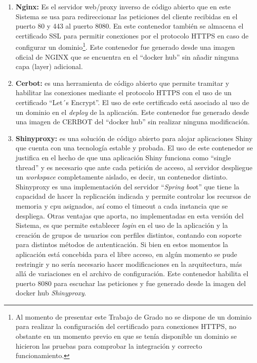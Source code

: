 \documentclass[
  12pt,
  openany]{book}
\begin{document}
\begin{enumerate}
\def\labelenumi{\arabic{enumi}.}
\item
  \textbf{Nginx:} Es el servidor web/proxy inverso de código abierto que en este Sistema se usa para redireccionar las peticiones del cliente recibidas en el puerto 80 y 443 al puerto 8080. En este contenedor también se almacena el certificado SSL para permitir conexiones por el protocolo HTTPS en caso de configurar un dominio\footnote{Al momento de presentar este Trabajo de Grado no se dispone de un dominio para realizar la configuración del certificado para conexiones HTTPS, no obstante en un momento previo en que se tenía disponible un dominio se hicieron las pruebas para comprobar la integración y correcto funcionamiento.}. Este contenedor fue generado desde una imagen oficial de NGINX que se encuentra en el ``docker hub'' sin añadir ninguna capa (layer) adicional.
\item
  \textbf{Cerbot:} es una herramienta de código abierto que permite tramitar y habilitar las conexiones mediante el protocolo HTTPS con el uso de un certificado ``Let´s Encrypt''. El uso de este certificado está asociado al uso de un dominio en el \emph{deploy} de la aplicación. Este contenedor fue generado desde una imagen de CERBOT del ``docker hub'' sin realizar ninguna modificación.
\item
  \textbf{Shinyproxy:} es una solución de código abierto para alojar aplicaciones Shiny \citep{shinyproxy2023} que cuenta con una tecnología estable y probada. El uso de este contenedor se justifica en el hecho de que una aplicación Shiny funciona como ``single thread'' y es necesario que ante cada petición de acceso, al servidor despliegue un \emph{workspace} completamente aislado, es decir, un contenedor distinto. Shinyproxy es una implementación del servidor ``\emph{Spring boo}t'' que tiene la capacidad de hacer la replicación indicada y permite controlar los recursos de memoria y cpu asignados, así como el timeout a cada instancia que se despliega. Otras ventajas que aporta, no implementadas en esta versión del Sistema, es que permite establecer \emph{login} en el uso de la aplicación y la creación de grupos de usuarios con perfiles distintos, contando con soporte para distintos métodos de autenticación. Si bien en estos momentos la aplicación está concebida para el libre acceso, en algún momento se pude restringir y no sería necesario hacer modificaciones en la arquitectura, más allá de variaciones en el archivo de configuración. Este contenedor habilita el puerto 8080 para escuchar las peticiones y fue generado desde la imagen del docker hub \emph{Shinyproxy}.

\end{enumerate}
\end{document}
